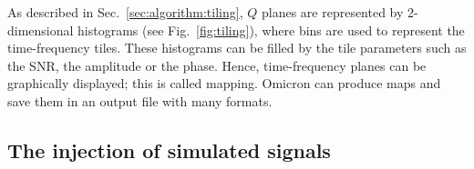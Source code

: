 As described in Sec.~\ref{sec:algorithm:tiling}, $Q$ planes are represented by 2-dimensional histograms (see Fig.~\ref{fig:tiling}), where bins are used to represent the time-frequency tiles. These histograms can be filled by the tile parameters such as the SNR, the amplitude or the phase. Hence, time-frequency planes can be graphically displayed; this is called mapping. Omicron can produce maps and save them in an output file with many formats.

\subsection{The injection of simulated signals} \label{sec:algorithm:injections}

